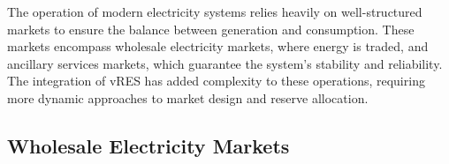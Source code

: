The operation of modern electricity systems relies heavily on well-structured markets to ensure the balance between generation and consumption. These markets encompass wholesale electricity markets, where energy is traded, and ancillary services markets, which guarantee the system's stability and reliability. The integration of \gls{vRES} has added complexity to these operations, requiring more dynamic approaches to market design and reserve allocation.\par


\subsection{Wholesale Electricity Markets}

